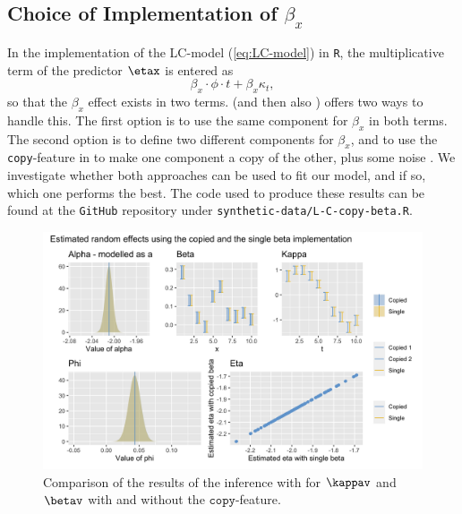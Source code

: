 \subsection{Choice of Implementation of $\beta_x$}
In the implementation of the LC-model (\ref{eq:LC-model}) in \texttt{R}, the multiplicative term of the predictor $\etax$ is entered as
\begin{equation}
    \beta_x\cdot\phi \cdot t + \beta_x\kappa_t,
\end{equation}
so that the $\beta_x$ effect exists in two terms. \inla (and then also \inlabru) offers two ways to handle this. The first option is to use the same component for $\beta_x$ in both terms. The second option is to define two different components for $\beta_x$, and to use the \texttt{copy}-feature in \inla to make one component a copy of the other, plus some noise \cite{MARTINS201368}. We investigate whether both approaches can be used to fit our model, and if so, which one performs the best. The code used to produce these results can be found at the \texttt{GitHub} repository under \texttt{synthetic-data/L-C-copy-beta.R}. 

\begin{figure}[h!]
    \centering
    \includegraphics[width=0.85\linewidth]{synthetic-data/Figures/copy-beta.png}
    \caption{Comparison of the results of the inference with \inlabru for $\kappav$ and $\betav$ with and without the $\texttt{copy}$-feature.}
    \label{fig:copyBetaComparison}
\end{figure}

